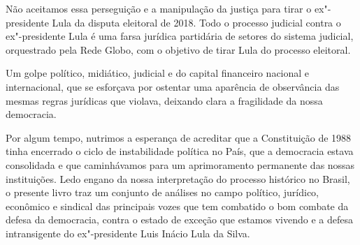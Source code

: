 Não aceitamos essa perseguição e a manipulação da justiça para tirar o ex"-presidente Lula da disputa eleitoral de 2018. Todo o processo judicial contra o ex"-presidente Lula é uma farsa jurídica partidária de setores do sistema judicial, orquestrado pela Rede Globo, com o objetivo de tirar Lula do processo eleitoral.

Um golpe político, midiático, judicial e do capital financeiro nacional e internacional, que se esforçava por ostentar uma aparência de observância das mesmas regras jurídicas que violava, deixando clara a fragilidade da nossa democracia.

Por algum tempo, nutrimos a esperança de acreditar que a Constituição de 1988 tinha encerrado o ciclo de instabilidade política no País, que a democracia estava consolidada e que caminhávamos para um aprimoramento permanente das nossas instituições. Ledo engano da nossa interpretação do processo histórico no Brasil, o presente livro traz um conjunto de análises no campo político, jurídico, econômico e sindical das principais vozes que tem combatido o bom combate da defesa da democracia, contra o estado de exceção que estamos vivendo e a defesa intransigente do ex"-presidente Luis Inácio Lula da Silva.

